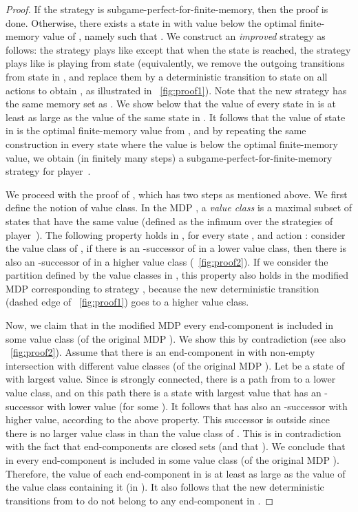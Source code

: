 \documentclass{article}
\begin{document}
\begin{proof}
\smallskip{}
If the strategy  is subgame-perfect-for-finite-memory, then the proof is done.
Otherwise, there exists a state  in 
with value below the optimal finite-memory value of , 
namely such that .
We construct an \emph{improved} strategy  as follows:
the strategy  plays like  except
that when the state  is reached, the strategy  plays
like  is playing from state  (equivalently, we remove the outgoing transitions from state 
in , and replace them by a deterministic transition to state  on all actions
to obtain , as illustrated in \figurename~\ref{fig:proof1}). 
Note that the new strategy  has the same memory set as . We show below that
the value of every state in  is at least as large as the value of the 
same state in  . It follows that the value of state  in 
is the optimal finite-memory value from , and by repeating the same construction
in every state where the value is below the optimal finite-memory value, we obtain
(in finitely many steps) a subgame-perfect-for-finite-memory strategy for player~.

\smallskip{}
We proceed with the proof of , which has two steps as mentioned above.
We first define the notion of value class. 
\smallskip{}
In the MDP , a \emph{value class} is a maximal subset of states that have 
the same value (defined as the infimum over the strategies of player~).
The following property holds in , for every state , and action :
consider the value class of , if there is an -successor of  
in a lower value class, then there is also an -successor of  in a 
higher value class (\figurename~\ref{fig:proof2}). 
If we consider the partition defined by the value classes
in , this property also holds in the modified MDP  
corresponding to strategy , because the new deterministic transition 
(dashed edge of  \figurename~\ref{fig:proof1}) goes to a higher value class.

\smallskip{}
Now, we claim that in the modified MDP  every end-component
is included in some value class (of the original MDP ).
We show this by contradiction (see also \figurename~\ref{fig:proof2}). 
Assume that there is an end-component  in 
with non-empty intersection with different value classes (of the original MDP ). 
Let  be a state of  with largest value. Since  is strongly connected,
there is a path from  to a lower value class, and on this path there is a state  
with largest value that has an -successor  with lower value (for some ). 
It follows that  has also an -successor with higher value, according to the above property. This
successor is outside  since there is no larger value class in  than the value class of . 
This is in contradiction with the fact that end-components are closed sets (and that ). 
We conclude that in  every end-component
is included in some value class (of the original MDP ).
Therefore, the value of each end-component in  is at least as large
as the value of the value class containing it (in ). 
It also follows that the new deterministic transitions from  to 
 do not belong to any end-component in .


\end{proof}
\end{document}
